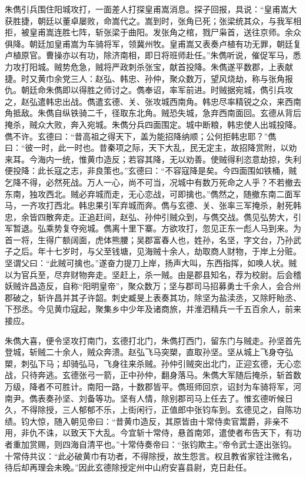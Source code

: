 朱儁引兵围住阳城攻打，一面差人打探皇甫嵩消息。探子回报，具说：“皇甫嵩大获胜捷，朝廷以董卓屡败，命嵩代之。嵩到时，张角已死；张梁统其众，与我军相拒，被皇甫嵩连胜七阵，斩张梁于曲阳。发张角之棺，戮尸枭首，送往京师。余众俱降。朝廷加皇甫嵩为车骑将军，领冀州牧。皇甫嵩又表奏卢植有功无罪，朝廷复卢植原官。曹操亦以有功，除济南相，即日将班师赴任。”朱儁听说，催促军马，悉力攻打阳城。贼势危急，贼将严政刺杀张宝，献首投降。朱儁遂平数郡，上表献捷。时又黄巾余党三人：赵弘、韩忠、孙仲，聚众数万，望风烧劫，称与张角报仇。朝廷命朱儁即以得胜之师讨之。儁奉诏，率军前进。时贼据宛城，儁引兵攻之，赵弘遣韩忠出战。儁遣玄德、关、张攻城西南角。韩忠尽率精锐之众，来西南角抵敌。朱儁自纵铁骑二千，径取东北角。贼恐失城，急弃西南面回。玄德从背后掩杀，贼众大败，奔入宛城。朱儁分兵四面围定。城中断粮，韩忠使人出城投降。儁不许。玄德曰：“昔高祖之得天下，盖为能招降纳顺；公何拒韩忠耶？”儁曰：“彼一时，此一时也。昔秦项之际，天下大乱，民无定主，故招降赏附，以劝来耳。今海内一统，惟黄巾造反；若容其降，无以劝善。使贼得利恣意劫掠，失利便投降：此长寇之志，非良策也。”玄德曰：“不容寇降是矣。今四面围如铁桶，贼乞降不得，必然死战。万人一心，尚不可当，况城中有数万死命之人乎？不若撤去东南，独攻西北。贼必弃城而走，无心恋战，可即擒也。”儁然之，随撤东南二面军马，一齐攻打西北。韩忠果引军弃城而奔。儁与玄德、关、张率三军掩杀，射死韩忠，余皆四散奔走。正追赶间，赵弘、孙仲引贼众到，与儁交战。儁见弘势大，引军暂退。弘乘势复夺宛城。儁离十里下寨。方欲攻打，忽见正东一彪人马到来。为首一将，生得广额阔面，虎体熊腰；吴郡富春人也，姓孙，名坚，字文台，乃孙武子之后。年十七岁时，与父至钱塘，见海贼十余人，劫取商人财物，于岸上分赃。坚谓父曰：“此贼可擒也。”遂奋力提刀上岸，扬声大叫，东西指挥，如唤人状。贼以为官兵至，尽弃财物奔走。坚赶上，杀一贼。由是郡县知名，荐为校尉。后会稽妖贼许昌造反，自称“阳明皇帝”，聚众数万；坚与郡司马招募勇士千余人，会合州郡破之，斩许昌并其子许韶。刺史臧旻上表奏其功，除坚为盐渎丞，又除盱眙丞、下邳丞。今见黄巾寇起，聚集乡中少年及诸商旅，并淮泗精兵一千五百余人，前来接应。

朱儁大喜，便令坚攻打南门，玄德打北门，朱儁打西门，留东门与贼走。孙坚首先登城，斩贼二十余人，贼众奔溃。赵弘飞马突槊，直取孙坚。坚从城上飞身夺弘槊，刺弘下马；却骑弘马，飞身往来杀贼。孙仲引贼突出北门，正迎玄德，无心恋战，只待奔逃。玄德张弓一箭，正中孙仲，翻身落马。朱儁大军随后掩杀，斩首数万级，降者不可胜计。南阳一路，十数郡皆平。儁班师回京，诏封为车骑将军，河南尹。儁表奏孙坚、刘备等功。坚有人情，除别郡司马上任去了。惟玄德听候日久，不得除授，三人郁郁不乐，上街闲行，正值郎中张钧车到。玄德见之，自陈功绩。钧大惊，随入朝见帝曰：“昔黄巾造反，其原皆由十常侍卖官鬻爵，非亲不用，非仇不诛，以致天下大乱。今宜斩十常侍，悬首南郊，遣使者布告天下，有功者重加赏赐，则四海自清平也。”十常侍奏帝曰：“张钧欺主。”帝令武士逐出张钧。十常侍共议：“此必破黄巾有功者，不得除授，故生怨言。权且教省家铨注微名，待后却再理会未晚。”因此玄德除授定州中山府安喜县尉，克日赴任。

